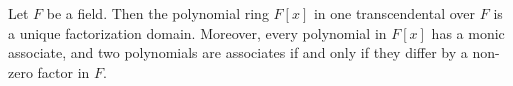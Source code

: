 Let $F$ be a field. Then the polynomial ring $F[x]$ in one transcendental over $F$ is a unique factorization domain. Moreover, every polynomial in $F[x]$ has a monic associate, and two polynomials are associates if and only if they differ by a non-zero factor in $F$.
